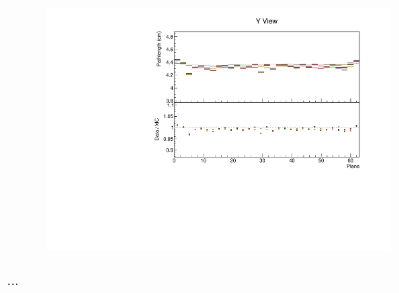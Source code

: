 \documentclass[12pt,a4paper]{article}
\begin{document}
\begin{figure}[h!]
\begin{subfigure}{0.5\textwidth}
  \end{subfigure}
  \begin{subfigure}{0.5\textwidth}
    \includegraphics[width=\linewidth]{essentialsec_tb/cm_plane_y.pdf}
  \end{subfigure}
  \caption{...}
  \label{figAbsCalibPlane2}
\end{figure}
\end{document}

